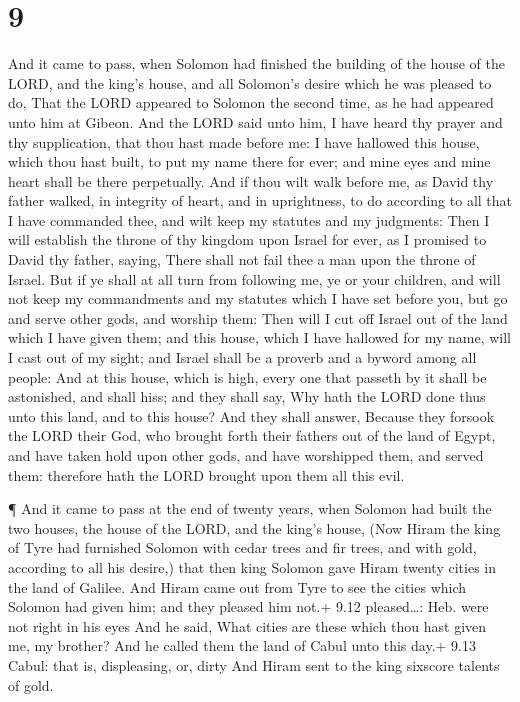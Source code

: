 \hypertarget{section-8}{%
\section{9}\label{section-8}}

 And it came to pass, when Solomon had finished the building
of the house of the LORD, and the king's house, and all Solomon's desire
which he was pleased to do,  That the LORD appeared to
Solomon the second time, as he had appeared unto him at Gibeon.
 And the LORD said unto him, I have heard thy prayer and thy
supplication, that thou hast made before me: I have hallowed this house,
which thou hast built, to put my name there for ever; and mine eyes and
mine heart shall be there perpetually.  And if thou wilt
walk before me, as David thy father walked, in integrity of heart, and
in uprightness, to do according to all that I have commanded thee, and
wilt keep my statutes and my judgments:  Then I will
establish the throne of thy kingdom upon Israel for ever, as I promised
to David thy father, saying, There shall not fail thee a man upon the
throne of Israel.  But if ye shall at all turn from
following me, ye or your children, and will not keep my commandments and
my statutes which I have set before you, but go and serve other gods,
and worship them:  Then will I cut off Israel out of the
land which I have given them; and this house, which I have hallowed for
my name, will I cast out of my sight; and Israel shall be a proverb and
a byword among all people:  And at this house, which is
high, every one that passeth by it shall be astonished, and shall hiss;
and they shall say, Why hath the LORD done thus unto this land, and to
this house?  And they shall answer, Because they forsook the
LORD their God, who brought forth their fathers out of the land of
Egypt, and have taken hold upon other gods, and have worshipped them,
and served them: therefore hath the LORD brought upon them all this
evil.

 ¶ And it came to pass at the end of twenty years, when
Solomon had built the two houses, the house of the LORD, and the king's
house,  (Now Hiram the king of Tyre had furnished Solomon
with cedar trees and fir trees, and with gold, according to all his
desire,) that then king Solomon gave Hiram twenty cities in the land of
Galilee.  And Hiram came out from Tyre to see the cities
which Solomon had given him; and they pleased him not.+ 9.12
pleased\ldots: Heb. were not right in his eyes  And he
said, What cities are these which thou hast given me, my brother? And he
called them the land of Cabul unto this day.+ 9.13 Cabul: that is,
displeasing, or, dirty  And Hiram sent to the king sixscore
talents of gold.


